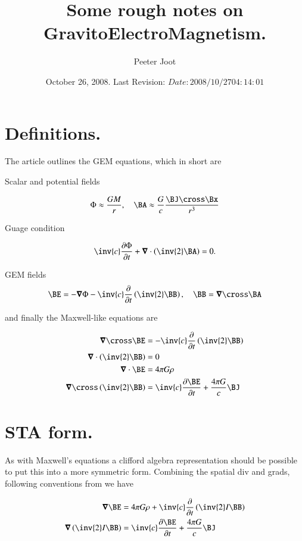 \documentclass{article}
\title{ Some rough notes on GravitoElectroMagnetism. }
\author{Peeter Joot}
\date{ October 26, 2008.  Last Revision: $Date: 2008/10/27 04:14:01 $ }
\begin{document}
\maketitle{}
\tableofcontents

\section{ Definitions. }

The article \cite{mashhoon2003gbr} outlines the GEM equations, which in short
are

Scalar and potential fields

\begin{align}
\Phi \approx \frac{GM}{r}, \quad \BA \approx \frac{G}{c} \frac{\BJ \cross \Bx}{r^3}
\end{align}

Guage condition

\begin{align}
\inv{c}\PD{t}{\Phi} + \spacegrad \cdot \left( \inv{2} \BA \right) = 0.
\end{align}

GEM fields
\begin{align}
\BE = - \spacegrad \Phi -\inv{c} \PD{t}{}\left( \inv{2} \BB \right), \quad \BB = \spacegrad \cross \BA
\end{align}

and finally the Maxwell-like equations are

\begin{align}
\spacegrad \cross \BE &= -\inv{c} \PD{t}{}\left(\inv{2}\BB\right) \\
\spacegrad \cdot \left( \inv{2} \BB \right) &= 0 \\
\spacegrad \cdot \BE &= 4 \pi G \rho \\
\spacegrad \cross \left( \inv{2} \BB \right) &= \inv{c} \PD{t}{\BE} + \frac{4\pi G}{c}\BJ
\end{align}

\section{ STA form. }

As with Maxwell's equations a clifford algebra representation should be possible to put this into a more symmetric form.  Combining the spatial div and grads, following conventions from \cite{doran2003gap} we have

\begin{align}
\spacegrad \BE &= 4 \pi G \rho + \inv{c} \PD{t}{}\left(\inv{2}I \BB\right) \\
\spacegrad \left( \inv{2} I \BB \right) &= \inv{c} \PD{t}{\BE} + \frac{4\pi G}{c}\BJ
\end{align}
\end{document}
